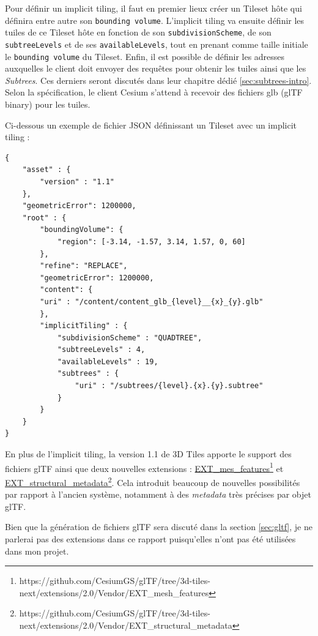 Pour définir un implicit tiling, il faut en premier lieux créer un Tileset hôte qui définira entre autre son \texttt{bounding volume}. L'implicit tiling va ensuite définir les tuiles de ce Tileset hôte en fonction de son \texttt{subdivisionScheme}, de son \texttt{subtreeLevels} et de ses \texttt{availableLevels}, tout en prenant comme taille initiale le \texttt{bounding volume} du Tileset. Enfin, il est possible de définir les adresses auxquelles le client doit envoyer des requêtes pour obtenir les tuiles ainsi que les \textit{Subtrees}. Ces derniers seront discutés dans leur chapitre dédié \autoref{sec:subtrees-intro}. Selon la spécification, le client Cesium s'attend à recevoir des fichiers glb (glTF binary) pour les tuiles.

\newpage
Ci-dessous un exemple de fichier JSON définissant un Tileset avec un implicit tiling :

\newpage
\begin{verbatim}
{
    "asset" : {
        "version" : "1.1"
    },
    "geometricError": 1200000,
    "root" : {
        "boundingVolume": {
            "region": [-3.14, -1.57, 3.14, 1.57, 0, 60]
        },
        "refine": "REPLACE",
        "geometricError": 1200000,
        "content": {
        "uri" : "/content/content_glb_{level}__{x}_{y}.glb"
        },
        "implicitTiling" : {
            "subdivisionScheme" : "QUADTREE",
            "subtreeLevels" : 4,
            "availableLevels" : 19,
            "subtrees" : {
                "uri" : "/subtrees/{level}.{x}.{y}.subtree"
            }
        }
    }
}
\end{verbatim}

En plus de l'implicit tiling, la version 1.1 de 3D Tiles apporte le support des fichiers glTF ainsi que deux nouvelles extensions : \href{https://github.com/CesiumGS/glTF/tree/3d-tiles-next/extensions/2.0/Vendor/EXT_mesh_features}{EXT\_mes\_features}\footnote{https://github.com/CesiumGS/glTF/tree/3d-tiles-next/extensions/2.0/Vendor/EXT\_mesh\_features} et \href{https://github.com/CesiumGS/glTF/tree/3d-tiles-next/extensions/2.0/Vendor/EXT_structural_metadata}{EXT\_structural\_metadata}\footnote{https://github.com/CesiumGS/glTF/tree/3d-tiles-next/extensions/2.0/Vendor/EXT\_structural\_metadata}. Cela introduit beaucoup de nouvelles possibilités par rapport à l'ancien système, notamment à des \textit{metadata} très précises par objet glTF.

Bien que la génération de fichiers glTF sera discuté dans la section \ref{sec:gltf}, je ne parlerai pas des extensions dans ce rapport puisqu'elles n'ont pas été utilisées dans mon projet.

